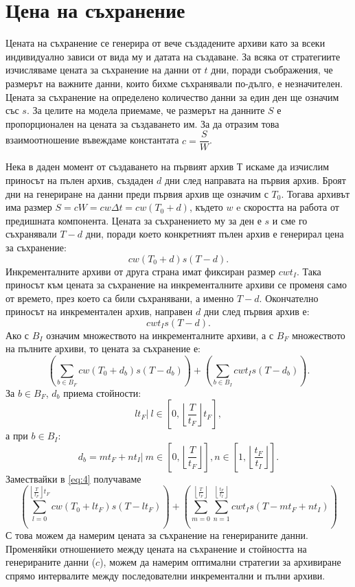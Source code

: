 \documentclass[11pt, a4paper]{article}
\theoremstyle{definition}
\begin{document}
	\section{Цена на съхранение}\label{Storage_price}
			Цената на съхранение се генерира от вече създадените архиви като за всеки индивидуално зависи от вида му и датата на създаване. За всяка от стратегиите изчисляваме цената за съхранение на данни от $t$ дни, поради съображения, че размерът на важните данни, които бихме съхранявали по-дълго, е незначителен. Цената за съхранение на определено количество  данни за един ден ще означим със $s$. За целите на модела приемаме, че размерът на данните $S$ е пропорционален на цената за създаването им. За да отразим това взаимоотношение въвеждаме константата $c = \dfrac{S}{W}$.\par
			Нека в даден момент от създаването на първият архив $Т$ искаме да изчислим приносът на пълен архив, създаден $d$ дни след направата на първия архив. Броят дни на генериране на данни преди първия архив ще означим с $T_0$. Тогава архивът има размер $S=cW=cw\Delta t=cw(T_0 + d)$, където $w$ e скоростта на работа от предишната компонента. Цената за съхранението му за ден е $s$ и сме го съхранявали $T-d$ дни, поради което конкретният пълен архив е генерирал цена за съхранение:
			$$
				cw(T_0 + d)s(T-d).
			$$
			Инкременталните архиви от друга страна имат фиксиран размер $cwt_I$. Така приносът към цената за съхранение на инкременталните архиви се променя само от времето, през което са били съхранявани, а именно $T-d$. Окончателно приносът на инкрементален архив, направен $d$ дни след първия архив е: 
			$$
					cwt_Is(T-d).
			$$
			Ако с $B_I$ означим множеството на инкременталните архиви, а с $B_F$ множеството на пълните архиви, то цената за съхранение е:
			\begin{equation}\label{eq:4}
				\left(\displaystyle\sum_{b\in B_F}cw(T_0 + d_b)s(T-d_b)\right) + 	\left(\displaystyle\sum_{b\in B_I}cwt_Is(T-d_b)\right).
			\end{equation}
			За $b\in B_F$, $d_b$ приема стойности:
			$$lt_F|\ l\in \left[0,\left\lfloor\dfrac{T}{t_F}\right\rfloor t_F\right],$$
			а при $b\in  B_I$:
			$$d_b= mt_F + nt_I|\ m\in \left[0, \left\lfloor\dfrac{T}{t_F}\right\rfloor\right],n\in \left[1, \left\lfloor\dfrac{t_F}{t_I}\right\rfloor\right].$$
			Замествайки в \ref{eq:4} получаваме
			\begin{equation}
				\left(\displaystyle\sum_{l = 0}^{\left\lfloor\frac{T}{t_F}\right\rfloor t_F}cw(T_0 + lt_F)s(T-lt_F)\right) + \left(\displaystyle\sum_{m = 0}^{\left\lfloor\frac{T}{t_F}\right\rfloor}\displaystyle\sum_{n = 1}^{\left\lfloor\frac{t_F}{t_I}\right\rfloor}cwt_Is(T-mt_F + nt_I)\right)
			\end{equation}
			С това можем да намерим цената за съхранение на генерираните данни. Променяйки отношението между цената на съхранение и стойността на генерираните данни ($c$), можем да намерим оптимални стратегии за архивиране спрямо интервалите между последователни инкрементални и пълни архиви.
\end{document}
